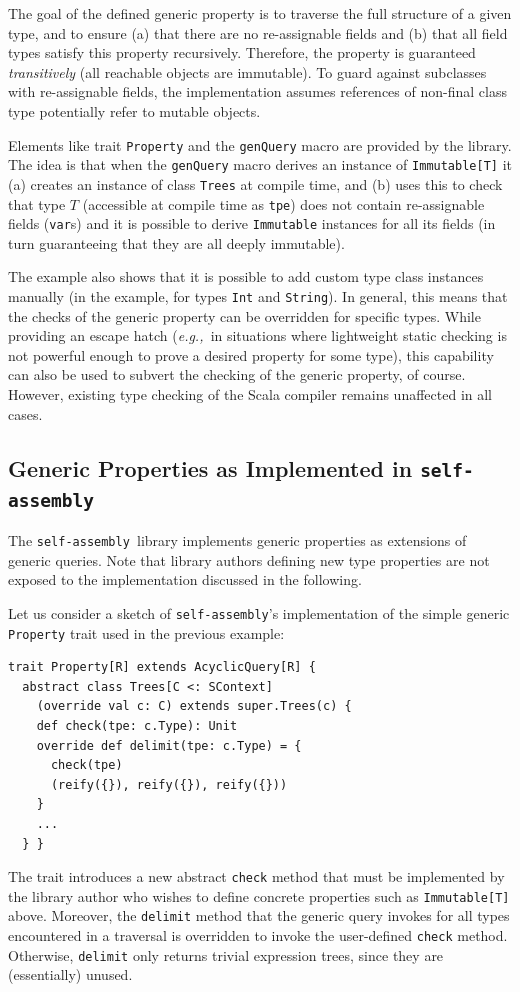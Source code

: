\documentclass[preprint,nocopyrightspace]{sigplanconf}
\newcommand{\eg}{{\em e.g.,~}}
\newcommand{\selfassembly}{\texttt{self-assembly~}}
\begin{document}
The goal of the defined generic property is to traverse the full structure of
a given type, and to ensure (a) that there are no re-assignable fields and (b)
that all field types satisfy this property recursively. Therefore, the property
is guaranteed {\em transitively} (all reachable objects are immutable). To
guard against subclasses with re-assignable fields, the implementation assumes
references of non-final class type potentially refer to mutable objects.

Elements like trait \verb|Property| and the \verb|genQuery| macro are provided
by the library. The idea is that when the \verb|genQuery| macro derives an
instance of \verb|Immutable[T]| it (a) creates an instance of class
\verb|Trees| at compile time, and (b) uses this to check that type $T$
(accessible at compile time as \verb|tpe|) does not contain re-assignable
fields (\verb|var|s) and it is possible to derive \verb|Immutable| instances
for all its fields (in turn guaranteeing that they are all deeply immutable).

The example also shows that it is possible to add custom type class instances
manually (in the example, for types \verb|Int| and \verb|String|). In general,
this means that the checks of the generic property can be overridden for
specific types. While providing an escape hatch (\eg in situations where
lightweight static checking is not powerful enough to prove a desired property for
some type), this capability can also be used to subvert the checking of the
generic property, of course. However, existing type checking of the Scala
compiler remains unaffected in all cases.


\subsection{Generic Properties as Implemented in \selfassembly}
\label{sec:genprop-implementation}

The \selfassembly library implements generic properties as extensions of
generic queries. Note that library authors defining new type properties are
not exposed to the implementation discussed in the following.

Let us consider a sketch of \texttt{self-assembly}'s implementation of the simple generic
\verb|Property| trait used in the previous example:
\begin{lstlisting}
trait Property[R] extends AcyclicQuery[R] {
  abstract class Trees[C <: SContext]
    (override val c: C) extends super.Trees(c) {
    def check(tpe: c.Type): Unit
    override def delimit(tpe: c.Type) = {
      check(tpe)
      (reify({}), reify({}), reify({}))
    }
    ...
  } }
\end{lstlisting}
\noindent
The trait introduces a new abstract \verb|check| method that must be
implemented by the library author who wishes to define concrete properties
such as \verb|Immutable[T]| above. Moreover, the \verb|delimit| method that the
generic query invokes for all types encountered in a traversal is overridden
to invoke the user-defined \verb|check| method. Otherwise, \verb|delimit| only
returns trivial expression trees, since they are (essentially) unused.
\end{document}
